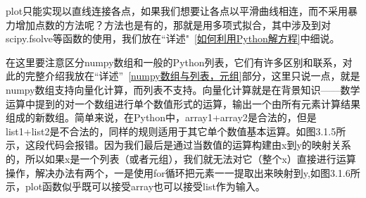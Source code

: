 \documentclass[12pt]{article}
\begin{document}
plot只能实现以直线连接各点，如果我们想要让各点以平滑曲线相连，而不采用暴力增加点数的方法呢？方法也是有的，那就是用多项式拟合，其中涉及到对scipy.fsolve等函数的使用，我们放在“详述"~\ref{如何利用Python解方程}中细说。

在这里要注意区分numpy数组和一般的Python列表，它们有许多区别和联系，对此的完整介绍我放在“详述”~\ref{numpy数组与列表，元组}部分，这里只说一点，就是numpy数组支持向量化计算，而列表不支持。向量化计算就是在背景知识——数学运算中提到的对一个数组进行单个数值形式的运算，输出一个由所有元素计算结果组成的新数组。简单来说，在Python中，array1+array2是合法的，但是list1+list2是不合法的，同样的规则适用于其它单个数值基本运算。如图3.1.5所示，这段代码会报错。因为我们最后是通过当数值的运算构建由x到y的映射关系的，所以如果x是一个列表（或者元组），我们就无法对它（整个x）直接进行运算操作，解决办法有两个，一是使用for循环把元素一一提取出来映射到y,如图3.1.6所示，plot函数似乎既可以接受array也可以接受list作为输入。
\end{document}
